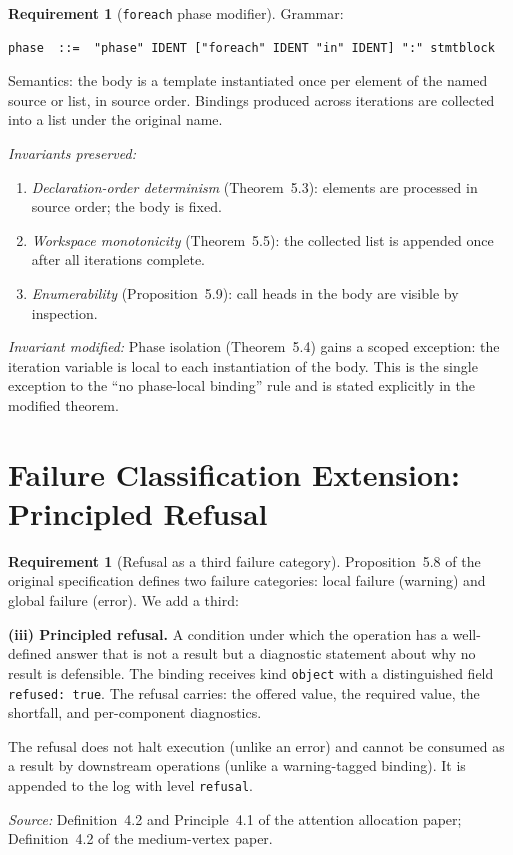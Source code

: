 \documentclass[11pt,a4paper]{article}
\theoremstyle{planstyle}
\theoremstyle{definition}
\newtheorem{requirement}[theorem]{Requirement}
\theoremstyle{remark}
\newcommand{\shk}[1]{\texttt{#1}}
\begin{document}
\begin{requirement}[\texttt{foreach} phase modifier]
\label{req:foreach}
Grammar:
\begin{lstlisting}
phase  ::=  "phase" IDENT ["foreach" IDENT "in" IDENT] ":" stmtblock
\end{lstlisting}
Semantics: the body is a template instantiated once per element of the
named source or list, in source order. Bindings produced across
iterations are collected into a list under the original name.

\emph{Invariants preserved:}
\begin{enumerate}[nosep,label=(\roman*)]
\item \emph{Declaration-order determinism} (Theorem~5.3): elements are
  processed in source order; the body is fixed.
\item \emph{Workspace monotonicity} (Theorem~5.5): the collected list
  is appended once after all iterations complete.
\item \emph{Enumerability} (Proposition~5.9): call heads in the body
  are visible by inspection.
\end{enumerate}

\emph{Invariant modified:} Phase isolation (Theorem~5.4) gains a
scoped exception: the iteration variable is local to each instantiation
of the body. This is the single exception to the ``no phase-local
binding'' rule and is stated explicitly in the modified theorem.
\end{requirement}

\section{Failure Classification Extension: Principled Refusal}
\label{sec:refusal}

\begin{requirement}[Refusal as a third failure category]
\label{req:refusal}
Proposition~5.8 of the original specification defines two failure
categories: local failure (warning) and global failure (error). We
add a third:

\textbf{(iii) Principled refusal.} A condition under which the
operation has a well-defined answer that is not a result but a
diagnostic statement about why no result is defensible. The binding
receives kind \shk{object} with a distinguished field
\shk{refused: true}. The refusal carries: the offered value, the
required value, the shortfall, and per-component diagnostics.

The refusal does not halt execution (unlike an error) and cannot be
consumed as a result by downstream operations (unlike a warning-tagged
binding). It is appended to the log with level \shk{refusal}.

\emph{Source:} Definition~4.2 and Principle~4.1 of the attention
allocation paper; Definition~4.2 of the medium-vertex paper.
\end{requirement}
\end{document}
